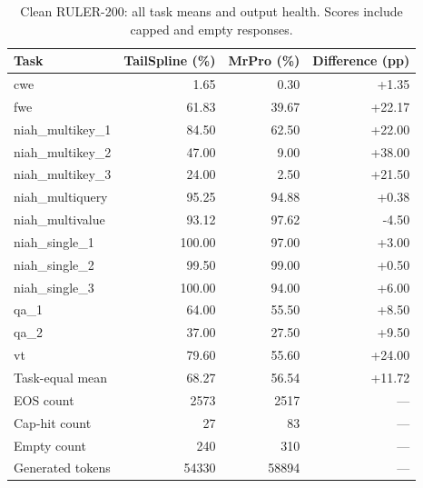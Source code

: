 \begin{table}[ht]
\centering\small
\caption{Clean RULER-200: all task means and output health. Scores include capped and empty responses.}
\label{tab:clean-full13}
\begin{tabular}{@{}lrrr@{}}
\toprule
Task & TailSpline (\%) & MrPro (\%) & Difference (pp) \\
\midrule
cwe & 1.65 & 0.30 & +1.35 \\
fwe & 61.83 & 39.67 & +22.17 \\
niah\_multikey\_1 & 84.50 & 62.50 & +22.00 \\
niah\_multikey\_2 & 47.00 & 9.00 & +38.00 \\
niah\_multikey\_3 & 24.00 & 2.50 & +21.50 \\
niah\_multiquery & 95.25 & 94.88 & +0.38 \\
niah\_multivalue & 93.12 & 97.62 & -4.50 \\
niah\_single\_1 & 100.00 & 97.00 & +3.00 \\
niah\_single\_2 & 99.50 & 99.00 & +0.50 \\
niah\_single\_3 & 100.00 & 94.00 & +6.00 \\
qa\_1 & 64.00 & 55.50 & +8.50 \\
qa\_2 & 37.00 & 27.50 & +9.50 \\
vt & 79.60 & 55.60 & +24.00 \\
\midrule
Task-equal mean & 68.27 & 56.54 & +11.72 \\
\midrule
EOS count & 2573 & 2517 & --- \\
Cap-hit count & 27 & 83 & --- \\
Empty count & 240 & 310 & --- \\
Generated tokens & 54330 & 58894 & --- \\
\bottomrule
\end{tabular}
\end{table}
